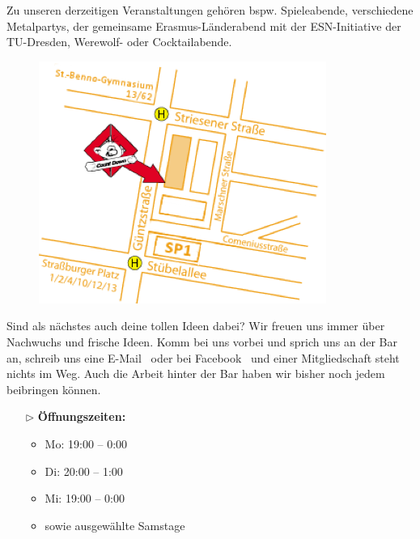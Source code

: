 Zu unseren derzeitigen Veranstaltungen gehören bspw. Spieleabende, verschiedene Metalpartys, der gemeinsame Erasmus-Länderabend mit der ESN-Initiative der TU-Dresden, Werewolf- oder Cocktailabende.

\begin{figure}%
  \includegraphics[width=\linewidth]{img/cd-anfahrt}
  \vspace{-1cm}
\end{figure}

Sind als nächstes auch deine tollen Ideen dabei?
Wir freuen uns immer über Nachwuchs und frische Ideen.
Komm bei uns vorbei und sprich uns an der Bar an, schreib uns eine E-Mail~ oder bei Facebook~ und einer Mitgliedschaft steht nichts im Weg.
Auch die Arbeit hinter der Bar haben wir bisher noch jedem beibringen können.

\begin{itemize}
    \item[$\rhd$] \textbf{Öffnungszeiten:}
    \begin{itemize}[noitemsep]
        \item Mo: 19:00 – 0:00
        \item Di: 20:00 – 1:00
        \item Mi: 19:00 – 0:00
        \item sowie ausgewählte Samstage
    \end{itemize}
\end{itemize}
